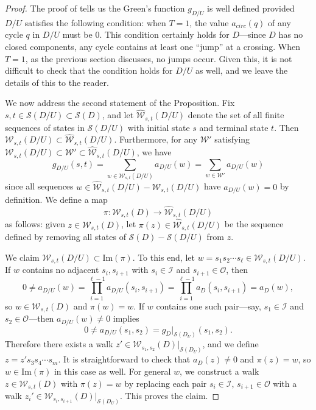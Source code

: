 \documentclass[11pt,hyp,]{nyjm}
\numberwithin{thm}{section}
\theoremstyle{definition}
\theoremstyle{remark}
\begin{document}
	\begin{proof}
		The proof of \cite[Theorem A]{ltw98} tells us the Green's function $g_{D/U}$ is well defined provided $D/U$ satisfies the following condition: when $T = 1$, the value $a_{circ}(q)$ of any cycle $q$ in $D/U$ must be $0$. This condition certainly holds for $D$---since $D$ has no closed components, any cycle contains at least one ``jump'' at a crossing. When $T = 1$, as the previous section discusses, no jumps occur. Given this, it is not difficult to check that the condition holds for $D/U$ as well, and we leave the details of this to the reader.
		
		We now address the second statement of the Proposition. Fix $s,t \in \mathcal{S}(D/U) \subset \mathcal{S}(D)$, and let $\widehat{\mathcal{W}}_{s,t}(D/U)$ denote the set of all finite sequences of states in $\mathcal{S}(D/U)$ with initial state $s$ and terminal state $t$. Then $\mathcal{W}_{s,t}(D/U) \subset \widehat{\mathcal{W}}_{s,t}(D/U)$. Furthermore, for any $\mathcal{W}'$ satisfying $\mathcal{W}_{s,t}(D/U) \subset \mathcal{W}' \subset  \widehat{\mathcal{W}}_{s,t}(D/U)$, we have
		$$
		g_{D/U}(s,t) = \sum_{w \in \mathcal{W}_{s,t}(D/U)} a_{D/U}(w) = \sum_{w \in \mathcal{W}'} a_{D/U}(w)
		$$
		since all sequences $w \in \widehat{\mathcal{W}}_{s,t}(D/U) - \mathcal{W}_{s,t}(D/U)$ have $a_{D/U}(w) = 0$ by definition. We define a map
		$$
		\pi : \mathcal{W}_{s,t}(D) \to \widehat{\mathcal{W}}_{s,t}(D/U)
		$$
		as follows: given $z \in \mathcal{W}_{s,t}(D)$, let $\pi(z) \in \widehat{\mathcal{W}}_{s,t}(D/U)$ be the sequence defined by removing all states of $\mathcal{S}(D) - \mathcal{S}(D/U)$ from $z$.
		
		We claim $\mathcal{W}_{s,t}(D/U) \subset \text{Im}(\pi)$. To this end, let $w = s_1s_2 \cdots s_\ell \in \mathcal{W}_{s,t}(D/U)$. If $w$ contains no adjacent $s_i, s_{i + 1}$ with $s_i \in \mathcal{I}$ and $s_{i + 1} \in \mathcal{O}$, then
		$$
		0 \neq a_{D/U}(w) = \prod_{i = 1}^{\ell - 1} a_{D/U}(s_i, s_{i + 1}) = \prod_{i = 1}^{\ell - 1} a_D(s_i, s_{i + 1}) = a_D(w),
		$$
		so $w \in \mathcal{W}_{s,t}(D)$ and $\pi(w) = w$. If $w$ contains one such pair---say, $s_1 \in \mathcal{I}$ and $s_2 \in \mathcal{O}$---then $a_{D/U}(w) \neq 0$ implies
		$$
		0 \neq a_{D/U}(s_1,s_2) = g_D|_{\mathcal{S}(D_U)}(s_1,s_2).
		$$
		Therefore there exists a walk $z' \in \mathcal{W}_{s_1,s_2}(D)|_{\mathcal{S}(D_U)}$, and we define $z = z's_3s_4 \cdots s_m$. It is straightforward to check that $a_D(z) \neq 0$ and $\pi(z) = w$, so $w \in \text{Im}(\pi)$ in this case as well. For general $w$, we construct a walk $z \in \mathcal{W}_{s,t}(D)$ with $\pi(z) = w$ by replacing each pair $s_i \in \mathcal{I}$, $s_{i + 1} \in \mathcal{O}$ with a walk $z_i' \in \mathcal{W}_{s_i,s_{i + 1}}(D)|_{\mathcal{S}(D_U)}$. This proves the claim.
		

\end{proof}
\end{document}
